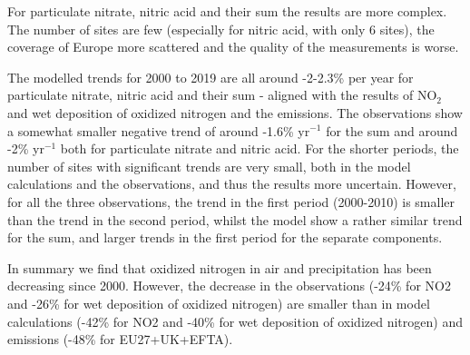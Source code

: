 For particulate nitrate, nitric acid and their sum the results are more complex. The number of sites are few (especially for nitric acid, with only 6 sites), the coverage of Europe more scattered and the quality of the measurements is worse. 

The modelled trends for 2000 to 2019 are all around -2-2.3\% per year for particulate nitrate, nitric acid and their sum - aligned with the results of NO$_2$ and wet deposition of oxidized nitrogen and the emissions. The observations show a somewhat smaller negative trend of around -1.6\% yr$^{-1}$ for the sum and around -2\% yr$^{-1}$ both for particulate nitrate and nitric acid. For the shorter periods, the number of sites with significant trends are very small, both in the model calculations and the observations, and thus the results more uncertain.
However, for all the three observations, the trend in the first period (2000-2010) is smaller than the trend in the second period, whilst the model show a rather similar trend for the sum, and larger trends in the first period for the separate components.

In summary we find that oxidized nitrogen in air and precipitation has been decreasing since 2000. However, the decrease in the observations (-24\% for NO2 and -26\% for wet deposition of oxidized nitrogen) are smaller than in model calculations (-42\% for NO2 and -40\% for wet deposition of oxidized nitrogen) and emissions (-48\% for EU27+UK+EFTA). 

